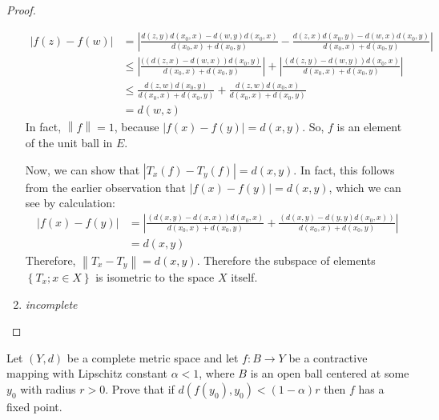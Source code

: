 \documentclass[12pt]{article}
\theoremstyle{definition}
\newenvironment{problem}[2][Problem]{\begin{trivlist}
\item[\hskip \labelsep {\bfseries #1}\hskip \labelsep {\bfseries #2.}]}{\end{trivlist}}
\begin{document}
\begin{proof}
\begin{enumerate}[label=(\roman*)]
			\begin{align*}
				\left \lvert { f(z)-f(w) } \right \lvert &= \left \lvert { \frac{d(z,y)d(x_0,x) - d(w,y)d(x_0,x)}{d(x_0,x)+d(x_0,y)} - \frac{d(z,x)d(x_0,y) - d(w,x)d(x_0, y)}{d(x_0,x)+d(x_0,y)} } \right \lvert \\
				&\leq \left \lvert { \frac{((d(z,x) - d(w,x))d(x_0,y)}{d(x_0,x)+d(x_0,y)}  } \right \lvert  + \left \lvert { \frac{(d(z,y) - d(w,y))d(x_0,x)}{d(x_0,x)+d(x_0,y)} } \right \lvert \\
					&\leq \frac{d(z,w)d(x_0,y)}{d(x_0, x)+d(x_0,y)} + \frac{d(z,w)d(x_0,x)}{d(x_0,x) + d(x_0, y)}\\
					&= d(w,z)
			\end{align*}
			In fact, $\left \lVert { f } \right \lVert  = 1$, because $\left \lvert { f(x) - f(y) } \right \lvert  = d(x,y)$. So, $f$ is an element of the unit ball in $E$.
			\par Now, we can show that $\left \lvert { T_x(f) - T_y(f) } \right \lvert = d(x,y)$. In fact, this follows from the earlier observation that $\left \lvert { f(x) - f(y) } \right \lvert  = d(x,y)$, which we can see by calculation:
			\begin{align*}
				\left \lvert { f(x) - f(y) } \right \lvert &= \left \lvert { \frac{(d(x,y) - d(x,x))d(x_0,x)}{d(x_0, x) + d(x_0, y)} + \frac{(d(x,y) - d(y,y)d(x_0,x))}{d(x_0,x)+d(x_0,y)} } \right \lvert \\
				&= d(x,y)
			\end{align*}
			Therefore, $\left \lVert { T_x - T_y } \right \lVert = d(x,y)$. Therefore the subspace of elements $\left\{ T_x ; x \in X \right\}$ is isometric to the space $X$ itself.
		\item \textit{incomplete}
	\end{enumerate}
\end{proof}
\begin{problem}{4}
	Let $(Y,d)$ be a complete metric space and let $f : B \to Y$ be a contractive mapping with Lipschitz constant $\alpha < 1$, where $B$ is an open ball centered at some $y_0$ with radius $r > 0$. Prove that if $d(f(y_0), y_0) < (1-\alpha)r$ then $f$ has a fixed point.
\end{problem}
\end{document}
